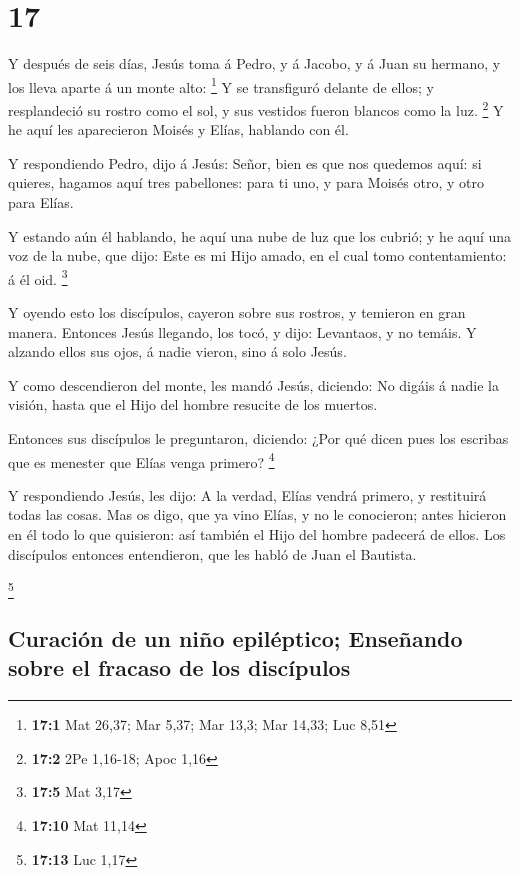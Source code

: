 \hypertarget{section-16}{%
\section{17}\label{section-16}}

 Y después de seis días, Jesús toma á Pedro, y á Jacobo, y á
Juan su hermano, y los lleva aparte á un monte alto: \footnote{\textbf{17:1}
  Mat 26,37; Mar 5,37; Mar 13,3; Mar 14,33; Luc 8,51}  Y se
transfiguró delante de ellos; y resplandeció su rostro como el sol, y
sus vestidos fueron blancos como la luz. \footnote{\textbf{17:2} 2Pe
  1,16-18; Apoc 1,16}  Y he aquí les aparecieron Moisés y
Elías, hablando con él.

 Y respondiendo Pedro, dijo á Jesús: Señor, bien es que nos
quedemos aquí: si quieres, hagamos aquí tres pabellones: para ti uno, y
para Moisés otro, y otro para Elías.

 Y estando aún él hablando, he aquí una nube de luz que los
cubrió; y he aquí una voz de la nube, que dijo: Este es mi Hijo amado,
en el cual tomo contentamiento: á él oid. \footnote{\textbf{17:5} Mat
  3,17}

 Y oyendo esto los discípulos, cayeron sobre sus rostros, y
temieron en gran manera.  Entonces Jesús llegando, los tocó,
y dijo: Levantaos, y no temáis.  Y alzando ellos sus ojos, á
nadie vieron, sino á solo Jesús.

 Y como descendieron del monte, les mandó Jesús, diciendo:
No digáis á nadie la visión, hasta que el Hijo del hombre resucite de
los muertos.

 Entonces sus discípulos le preguntaron, diciendo: ¿Por qué
dicen pues los escribas que es menester que Elías venga primero?
\footnote{\textbf{17:10} Mat 11,14}

 Y respondiendo Jesús, les dijo: A la verdad, Elías vendrá
primero, y restituirá todas las cosas.  Mas os digo, que ya
vino Elías, y no le conocieron; antes hicieron en él todo lo que
quisieron: así también el Hijo del hombre padecerá de ellos.
 Los discípulos entonces entendieron, que les habló de Juan
el Bautista.

\footnote{\textbf{17:13} Luc 1,17}

\hypertarget{curaciuxf3n-de-un-niuxf1o-epiluxe9ptico-enseuxf1ando-sobre-el-fracaso-de-los-discuxedpulos}{%
\subsection{Curación de un niño epiléptico; Enseñando sobre el fracaso
de los
discípulos}\label{curaciuxf3n-de-un-niuxf1o-epiluxe9ptico-enseuxf1ando-sobre-el-fracaso-de-los-discuxedpulos}}


